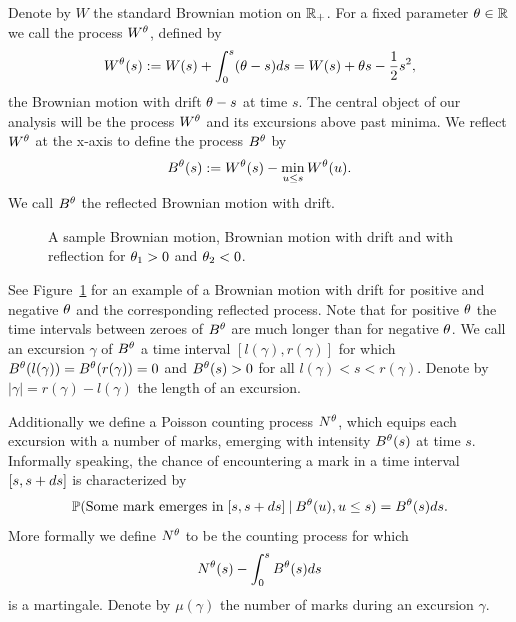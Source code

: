 Denote by $W$ the standard Brownian motion on $\mathbb{R}_+$. 
For a fixed parameter $\theta \in \mathbb{R}$ we call the process $W^{\theta}$, defined by
\begin{equation}
	W^{\theta}(s) := W(s) + \int_{0}^{s}(\theta -s)ds = W(s) + \theta s - \frac{1}{2}s^2,
\end{equation}
the Brownian motion with drift $\theta -s$ at time $s$.
The central object of our analysis will be the process $W^{\theta}$ and its excursions above past minima.
We reflect $W^{\theta}$ at the x-axis to define the process $B^{\theta}$ by
\begin{equation}
	B^{\theta}(s) := W^{\theta}(s) - \min_{u \leq s}W^{\theta}(u).
\end{equation}
We call $B^{\theta}$ the reflected Brownian motion with drift.

\begin{figure}[h]%
	\centering
	\subfloat[$W(s)$]{}%
	\quad
	\subfloat[$W^{\pp_1}(s)$]{}%
	\quad
	\subfloat[$B^{\pp_1}(s)$]{}%
	\quad
	\subfloat[$W^{\pp_2}(s)$]{}%
	\quad
	\subfloat[$B^{\pp_2}(s)$]{}%
	\caption{A sample Brownian motion, Brownian motion with drift and with reflection for $\theta_1>0$ and $\theta_2<0$.}%
	\label{F: BM}%
\end{figure}

See Figure~\ref{F: BM} for an example of a Brownian motion with drift for positive and negative $\theta$ and the corresponding reflected process.
Note that for positive $\theta$ the time intervals between zeroes of $B^{\theta}$ are much longer than for negative $\theta$.
We call an excursion $\gamma$ of $B^{\theta}$ a time interval $[l(\gamma), r(\gamma)]$ for which $B^{\theta}(l(\gamma)) = B^{\theta}(r(\gamma)) = 0$
and $B^{\theta}(s) > 0$ for all $l(\gamma) < s < r(\gamma)$.
Denote by $|\gamma| = r(\gamma) - l(\gamma)$ the length of an excursion.

Additionally we define a Poisson counting process $N^{\theta}$, 
which equips each excursion with a number of marks,
emerging with intensity $B^{\theta}(s)$ at time $s$.
Informally speaking, the chance of encountering a mark in a time interval $[s, s+ds]$ is characterized by
\begin{equation}
	\mathbb{P}( \text{Some mark emerges in} \; [s, s+ds] \: | \: B^{\theta}(u), u \leq s ) = B^{\theta}(s)ds.
\end{equation}
More formally we define $N^{\theta}$ to be the counting process for which
\begin{equation}
	N^{\theta}(s) - \int_{0}^{s} B^{\theta}(s)ds
\end{equation}
is a martingale.
Denote by $\mu(\gamma)$ the number of marks during an excursion $\gamma$.

